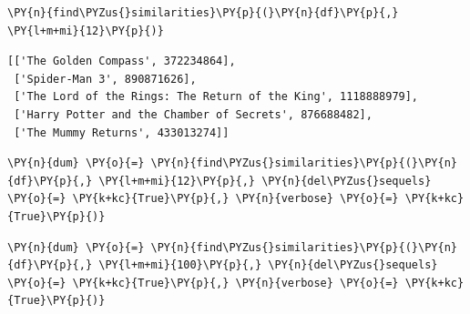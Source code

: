     \begin{tcolorbox}[breakable, size=fbox, boxrule=1pt, pad at break*=1mm,colback=cellbackground, colframe=cellborder]
\begin{Verbatim}[commandchars=\\\{\}]
\PY{n}{find\PYZus{}similarities}\PY{p}{(}\PY{n}{df}\PY{p}{,} \PY{l+m+mi}{12}\PY{p}{)}
\end{Verbatim}
\end{tcolorbox}

            \begin{tcolorbox}[breakable, boxrule=.5pt, size=fbox, pad at break*=1mm, opacityfill=0]
\begin{Verbatim}[commandchars=\\\{\}]
[['The Golden Compass', 372234864],
 ['Spider-Man 3', 890871626],
 ['The Lord of the Rings: The Return of the King', 1118888979],
 ['Harry Potter and the Chamber of Secrets', 876688482],
 ['The Mummy Returns', 433013274]]
\end{Verbatim}
\end{tcolorbox}
        
    \begin{tcolorbox}[breakable, size=fbox, boxrule=1pt, pad at break*=1mm,colback=cellbackground, colframe=cellborder]
\begin{Verbatim}[commandchars=\\\{\}]
\PY{n}{dum} \PY{o}{=} \PY{n}{find\PYZus{}similarities}\PY{p}{(}\PY{n}{df}\PY{p}{,} \PY{l+m+mi}{12}\PY{p}{,} \PY{n}{del\PYZus{}sequels} \PY{o}{=} \PY{k+kc}{True}\PY{p}{,} \PY{n}{verbose} \PY{o}{=} \PY{k+kc}{True}\PY{p}{)}
\end{Verbatim}
\end{tcolorbox}

    \begin{tcolorbox}[breakable, size=fbox, boxrule=1pt, pad at break*=1mm,colback=cellbackground, colframe=cellborder]
\begin{Verbatim}[commandchars=\\\{\}]
\PY{n}{dum} \PY{o}{=} \PY{n}{find\PYZus{}similarities}\PY{p}{(}\PY{n}{df}\PY{p}{,} \PY{l+m+mi}{100}\PY{p}{,} \PY{n}{del\PYZus{}sequels} \PY{o}{=} \PY{k+kc}{True}\PY{p}{,} \PY{n}{verbose} \PY{o}{=} \PY{k+kc}{True}\PY{p}{)}
\end{Verbatim}
\end{tcolorbox}


